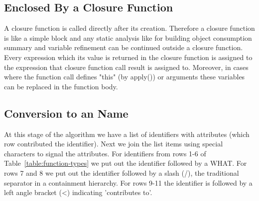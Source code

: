 \documentclass[10pt, preprint]{sigplanconf}
\begin{document}
\begin{table}
\centering
{}
\caption{JavaScript Expression Reduction to Name.}
\label{expression-reduction} 
\end{table}    

\subsection{Enclosed By a Closure Function}
A closure function is called directly after its creation. Therefore a closure function is like a simple block and any static analysis like
for building object consumption summary and variable refinement can be continued outside a closure function. Every expression which its value
is returned in the closure function is assigned to the expression that closure function call result is assigned to. Moreover, in cases where the
function call defines "this" (by apply()) or arguments these variables can be replaced in the function body.

\subsection{Conversion to an Name}
At this stage of the algorithm we have a list of identifiers with attributes (which row contributed the identifier). Next we join the list items using special characters to signal the attributes. For identifiers from rows 1-6 of Table~\ref{table:function-types} we put out the identifier followed by a WHAT. For rows 7 and 8 we put out the identifier followed by a slash (/), the traditional separator in a containment hierarchy. For rows 9-11 the identifier is followed by a left angle bracket (<) indicating 'contributes to'. 
\end{document}

